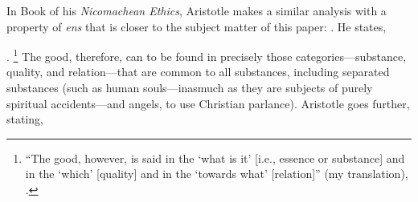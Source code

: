 In Book  of his \emph{Nicomachean Ethics}, Aristotle makes a similar analysis with a property of \emph{ens} that is closer to the subject matter of this paper: . He states, {.%
%
\footnote{\enquote{The good, however, is said in the \enquote{what is it} [i.e., essence or substance] and in the \enquote{which} [quality] and in the \enquote{towards what} [relation]} (my translation), \cite[, 1, 1096a19-23]{aristotle:ethics}.}
%
The good, therefore, can to be found in precisely those categories---substance, quality, and relation---that are common to all substances, including separated substances (such as human souls---inasmuch as they are subjects of purely spiritual accidents---and angels, to use Christian parlance). Aristotle goes further, stating,

}
